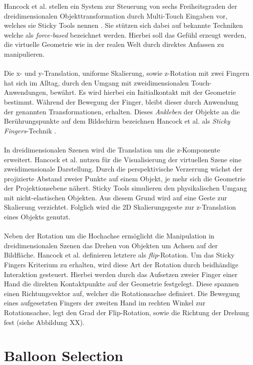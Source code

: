 Hancock et al. stellen ein System zur Steuerung von sechs Freiheitsgraden der dreidimensionalen Objekttransformation durch Multi-Touch Eingaben vor, welches sie Sticky Tools nennen \cite{hancock:2009}. Sie stützen sich dabei auf bekannte Techniken welche als \emph{force-based} bezeichnet werden. Hierbei soll das Gefühl erzeugt werden, die virtuelle Geometrie wie in der realen Welt durch direktes Anfassen zu manipulieren. 
\\\\
Die x- und y-Translation, uniforme Skalierung, sowie z-Rotation mit zwei Fingern hat sich im Alltag, durch den Umgang mit zweidimensionalen Touch-Anwendungen, bewährt. Es wird hierbei ein Initialkontakt mit der Geometrie bestimmt. Während der Bewegung der Finger, bleibt dieser durch Anwendung der genannten Transformationen, erhalten. Dieses \emph{Ankleben} der Objekte an die Berührungspunkte auf dem Bildschirm bezeichnen Hancock et al. als \emph{Sticky Fingers}-Technik \cite{hancock:2007,hancock:2009}.
\\\\
In dreidimensionalen Szenen wird die Translation um die z-Komponente erweitert. Hancock et al. nutzen für die Visualisierung der virtuellen Szene eine zweidimensionale Darstellung. Durch die perspektivische Verzerrung wächst der projizierte Abstand zweier Punkte auf einem Objekt, je mehr sich die Geometrie der Projektionsebene nähert. Sticky Tools simulieren den physikalischen Umgang mit nicht-elastischen Objekten. Aus diesem Grund wird auf eine Geste zur Skalierung verzichtet. Folglich wird die 2D Skalierungsgeste zur z-Translation eines Objekts genutzt.
\\\\
Neben der Rotation um die Hochachse ermöglicht die Manipulation in dreidimensionalen Szenen das Drehen von Objekten um Achsen auf der Bildfläche. Hancock et al. definieren letztere als \emph{flip}-Rotation. Um das Sticky Fingers Kriterium zu erhalten, wird diese Art der Rotation durch beidhändige Interaktion gesteuert. Hierbei werden durch das Aufsetzen zweier Finger einer Hand die direkten Kontaktpunkte auf der Geometrie festgelegt. Diese spannen einen Richtungsvektor auf, welcher die Rotationsachse definiert. Die Bewegung eines aufgesetzten Fingers der zweiten Hand im rechten Winkel zur Rotationsachse, legt den Grad der Flip-Rotation, sowie die Richtung der Drehung fest (siehe Abbildung XX).


\section{Balloon Selection}
\label{sec:related_balloon_selection}

